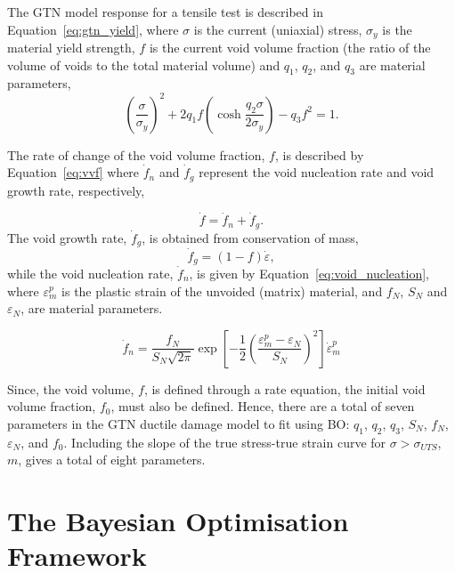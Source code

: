 \documentclass[preprint, review, 12pt]{elsarticle}
\begin{document}
	The GTN model response for a tensile test is described in Equation~\ref{eq:gtn_yield}, where $\sigma$ is the current (uniaxial) stress, $\sigma_y$ is the material yield strength, $f$ is the current void volume fraction (the ratio of the volume of voids to the total material volume) and $q_1$, $q_2$, and $q_3$ are material parameters,
	\begin{equation}
		\left( \frac{\sigma}{\sigma_y} \right)^2 + 2q_{1}f\left( \cosh \frac{q_2 \sigma}{2\sigma_y} \right) - q_3 f^2 = 1.
		\label{eq:gtn_yield}
	\end{equation}

	The rate of change of the void volume fraction, $f$, is described by Equation~\ref{eq:vvf} where $\dot{f}_n$ and $\dot{f}_g$ represent the void nucleation rate and void growth rate, respectively,

	\begin{equation}
		\dot{f} = \dot{f}_n + \dot{f}_g.
		\label{eq:vvf}
	\end{equation}
	The void growth rate, $\dot{f}_g$, is obtained from conservation of mass,
	\begin{equation}
		\dot{f}_g = (1-f)\dot{\varepsilon},
		\label{eq:void_growth}
	\end{equation}
	while the void nucleation rate, $\dot{f}_n$, is given by Equation~\ref{eq:void_nucleation}, where $\varepsilon^p_m$ is the plastic strain of the unvoided (matrix) material, and $f_N$, $S_N$ and $\varepsilon_N$, are material parameters.

	\begin{equation}
		\dot{f}_n = \frac{f_N}{S_N \sqrt{2\pi}} \exp \left[ -\frac{1}{2} \left( \frac{{\varepsilon}_m^p -\varepsilon_N}{S_N} \right) ^ 2 \right] \dot{\varepsilon}_m^p
		\label{eq:void_nucleation}
	\end{equation}

	Since, the void volume, $f$, is defined through a rate equation, the initial void volume fraction, $f_0$, must also be defined.
	Hence, there are a total of seven parameters in the GTN ductile damage model to fit using BO: $q_1$, $q_2$, $q_3$, $S_N$, $f_N$, $\varepsilon_N$, and $f_0$.
	Including the slope of the true stress-true strain curve for $\sigma>\sigma_{UTS}$, $m$, gives a total of eight parameters.

	\section{The Bayesian Optimisation Framework}
	\label{h:general_bo}
\end{document}
